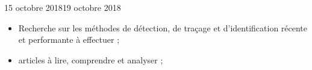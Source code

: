\documentclass[12pt]{fiche-rd-info}
\begin{document}
\begin{fichesuivi}{15 octobre 2018}{19 octobre 2018}
	\begin{planification}
		\begin{itemize}
			\item Recherche sur les méthodes de détection, de traçage et d'identification récente et performante à effectuer ;
			\item articles à lire, comprendre et analyser ;
		\end{itemize}
	\end{planification}
\end{fichesuivi}
\end{document}
